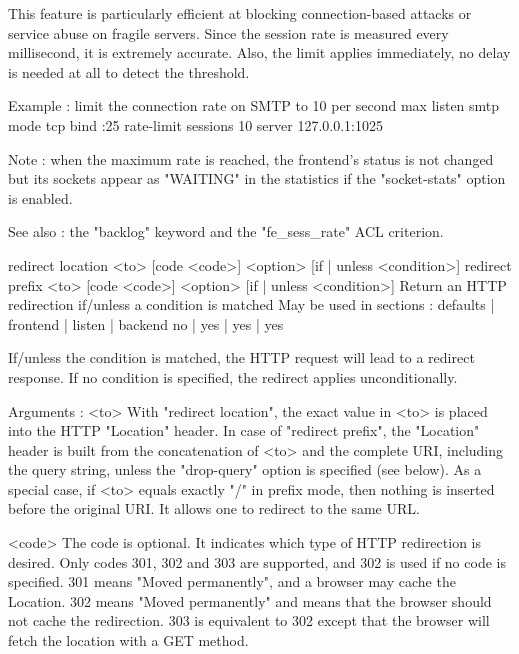   This feature is particularly efficient at blocking connection-based attacks
  or service abuse on fragile servers. Since the session rate is measured every
  millisecond, it is extremely accurate. Also, the limit applies immediately,
  no delay is needed at all to detect the threshold.

  Example : limit the connection rate on SMTP to 10 per second max
        listen smtp
            mode tcp
            bind :25
            rate-limit sessions 10
            server 127.0.0.1:1025

  Note : when the maximum rate is reached, the frontend's status is not changed
         but its sockets appear as "WAITING" in the statistics if the
         "socket-stats" option is enabled.

  See also : the "backlog" keyword and the "fe_sess_rate" ACL criterion.


redirect location <to> [code <code>] <option> [{if | unless} <condition>]
redirect prefix   <to> [code <code>] <option> [{if | unless} <condition>]
  Return an HTTP redirection if/unless a condition is matched
  May be used in sections :   defaults | frontend | listen | backend
                                 no    |    yes   |   yes  |   yes

  If/unless the condition is matched, the HTTP request will lead to a redirect
  response. If no condition is specified, the redirect applies unconditionally.

  Arguments :
    <to>      With "redirect location", the exact value in <to> is placed into
              the HTTP "Location" header. In case of "redirect prefix", the
              "Location" header is built from the concatenation of <to> and the
              complete URI, including the query string, unless the "drop-query"
              option is specified (see below). As a special case, if <to>
              equals exactly "/" in prefix mode, then nothing is inserted
              before the original URI. It allows one to redirect to the same
              URL.

    <code>    The code is optional. It indicates which type of HTTP redirection
              is desired. Only codes 301, 302 and 303 are supported, and 302 is
              used if no code is specified. 301 means "Moved permanently", and
              a browser may cache the Location. 302 means "Moved permanently"
              and means that the browser should not cache the redirection. 303
              is equivalent to 302 except that the browser will fetch the
              location with a GET method.

